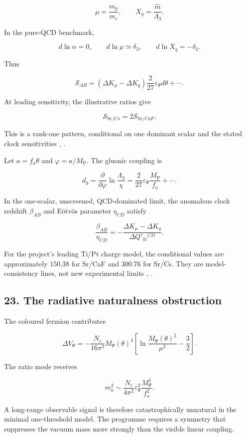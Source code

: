 \documentclass[
]{article}
\begin{document}
\[
\mu=\frac{m_p}{m_e},
\qquad
X_q=\frac{\widehat m}{\Lambda_3}.
\]

In the pure-QCD benchmark,

\[
d\ln\alpha=0,
\qquad
d\ln\mu\simeq\delta_3,
\qquad
d\ln X_q=-\delta_3.
\]

Thus

\[
\boxed{
\mathcal S_{AB}
=(\Delta K_\mu-\Delta K_q)
\frac{2}{27}\varepsilon_\Psi d\theta+\cdots.
}
\]

At leading sensitivity, the illustrative ratios give

\[
\mathcal S_{\mathrm{Sr}/Cs}
=2\mathcal S_{\mathrm{Sr}/CaF}.
\]

This is a rank-one pattern, conditional on one dominant scalar and the
stated clock sensitivities ,
.

Let \(a=f_a\theta\) and \(\varphi=a/M_{\mathrm{P}}\). The gluonic
coupling is

\[
d_g
=\frac{\partial}{\partial\varphi}
\ln\frac{\Lambda_3}{\chi}
=\frac{2}{27}\varepsilon_\Psi\frac{M_{\mathrm{P}}}{f_a}+\cdots.
\]

In the one-scalar, unscreened, QCD-dominated limit, the anomalous clock
redshift \(\beta_{AB}\) and Eötvös parameter \(\eta_{CD}\) satisfy

\[
\boxed{
\frac{\beta_{AB}}{\eta_{CD}}
=-\frac{\Delta K_\mu-\Delta K_q}
{\Delta Q'_{\widehat m}{}^{CD}}.
}
\]

For the project's leading Ti/Pt charge model, the conditional values are
approximately \(150.38\) for Sr/CaF and \(300.76\) for Sr/Cs. They are
model-consistency lines, not new experimental limits
,
.

\subsection{23. The radiative naturalness
obstruction}\label{the-radiative-naturalness-obstruction}

The coloured fermion contributes

\[
\Delta V_\Psi
=-\frac{N_c}{16\pi^2}M_\Psi(\theta)^4
\left[\ln\frac{M_\Psi(\theta)^2}{\mu^2}-\frac32\right].
\]

The ratio mode receives

\[
\boxed{
m_a^2\sim\frac{N_c}{4\pi^2}
\varepsilon_\Psi^2\frac{M_\Psi^4}{f_a^2}.
}
\]

A long-range observable signal is therefore catastrophically unnatural
in the minimal one-threshold model. The programme requires a symmetry
that suppresses the vacuum mass more strongly than the visible linear
coupling.
\end{document}
